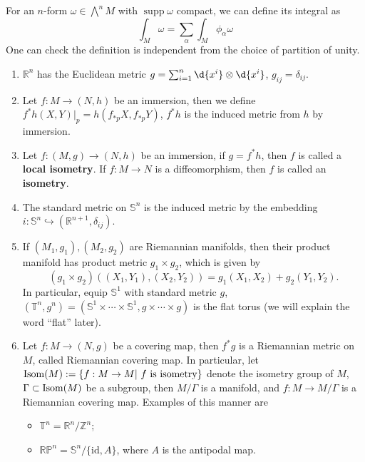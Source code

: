 \begin{rem}
    For an $n$-form $\omega\in\bigwedge^nM$ with $\operatorname{supp}\omega$ compact, we can define its integral as
    \[\int_M\omega=\sum_\alpha\int_M\phi_\alpha\omega\]
    One can check the definition is independent from the choice of partition of unity.
\end{rem}

\begin{eg}
    \begin{enumerate}[(1)]
        \item $\mathbb{R}^n$ has the Euclidean metric $g=\sum_{i=1}^n\d{x^i}\otimes\d{x^i}$, $g_{ij}=\delta_{ij}$.
        \item Let $f:M\to(N,h)$ be an immersion, then we define $f^*h(X,Y)|_p=h(f_{*p}X,f_{*p}Y)$, $f^*h$ is the induced metric from $h$ by immersion.
        \item Let $f:(M,g)\to(N,h)$ be an immersion, if $g=f^*h$, then $f$ is called a \textbf{local isometry}.
        If $f:M\to N$ is a diffeomorphism, then $f$ is called an \textbf{isometry}.
        \item The standard metric on $\mathbb{S}^n$ is the induced metric by the embedding $i:\mathbb{S}^n\hookrightarrow(\mathbb{R}^{n+1},\delta_{ij})$.
        \item If $(M_1,g_1),(M_2,g_2)$ are Riemannian manifolds, then their product manifold has product metric $g_1\times g_2$, which is given by
        \[(g_1\times g_2)((X_1,Y_1),(X_2,Y_2))=g_1(X_1,X_2)+g_2(Y_1,Y_2).\]
        In particular, equip $\mathbb{S}^1$ with standard metric $g$, $(\mathbb{T}^n,g^n)=(\mathbb{S}^1\times\cdots\times\mathbb{S}^1,g\times\cdots\times g)$ is the flat torus (we will explain the word ``flat'' later).
        \item Let $f:M\to(N,g)$ be a covering map, then $f^*g$ is a Riemannian metric on $M$, called Riemannian covering map.
        In particular, let $\operatorname{Isom}(M):=\{f:M\to M|\ f\ \text{is isometry}\}$ denote the isometry group of $M$, $\Gamma\subset\operatorname{Isom}(M)$ be a subgroup, then $M/\Gamma$ is a manifold, and $f:M\to M/\Gamma$ is a Riemannian covering map.
        Examples of this manner are
        \begin{itemize}
            \item $\mathbb{T}^n=\mathbb{R}^n/\mathbb{Z}^n$;
            \item $\mathbb{RP}^n=\mathbb{S}^n/\{\mathrm{id},A\}$, where $A$ is the antipodal map.
        \end{itemize}
    \end{enumerate}
\end{eg}

